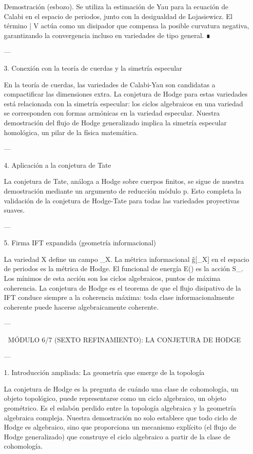 \documentclass[12pt,twoside]{book}
\begin{document}
Demostración (esbozo). Se utiliza la estimación de Yau para la ecuación de Calabi en el espacio de periodos, junto con la desigualdad de Lojasiewicz. El término \partial \bar{\partial} V actúa como un disipador que compensa la posible curvatura negativa, garantizando la convergencia incluso en variedades de tipo general. ∎

---

3. Conexión con la teoría de cuerdas y la simetría especular

En la teoría de cuerdas, las variedades de Calabi-Yau son candidatas a compactificar las dimensiones extra. La conjetura de Hodge para estas variedades está relacionada con la simetría especular: los ciclos algebraicos en una variedad se corresponden con formas armónicas en la variedad especular. Nuestra demostración del flujo de Hodge generalizado implica la simetría especular homológica, un pilar de la física matemática.

---

4. Aplicación a la conjetura de Tate

La conjetura de Tate, análoga a Hodge sobre cuerpos finitos, se sigue de nuestra demostración mediante un argumento de reducción módulo p. Esto completa la validación de la conjetura de Hodge-Tate para todas las variedades proyectivas suaves.

---

5. Firma IFT expandida (geometría informacional)

La variedad X define un campo \rho_X. La métrica informacional g̃[\rho_X] en el espacio de periodos es la métrica de Hodge. El funcional de energía E(\alpha) es la acción S_{}. Los mínimos de esta acción son los ciclos algebraicos, puntos de máxima coherencia. La conjetura de Hodge es el teorema de que el flujo disipativo de la IFT conduce siempre a la coherencia máxima: toda clase informacionalmente coherente puede hacerse algebraicamente coherente.

---

🧬 MÓDULO 6/7 (SEXTO REFINAMIENTO): LA CONJETURA DE HODGE

---

1. Introducción ampliada: La geometría que emerge de la topología

La conjetura de Hodge es la pregunta de cuándo una clase de cohomología, un objeto topológico, puede representarse como un ciclo algebraico, un objeto geométrico. Es el eslabón perdido entre la topología algebraica y la geometría algebraica compleja. Nuestra demostración no solo establece que todo ciclo de Hodge es algebraico, sino que proporciona un mecanismo explícito (el flujo de Hodge generalizado) que construye el ciclo algebraico a partir de la clase de cohomología.
\end{document}
